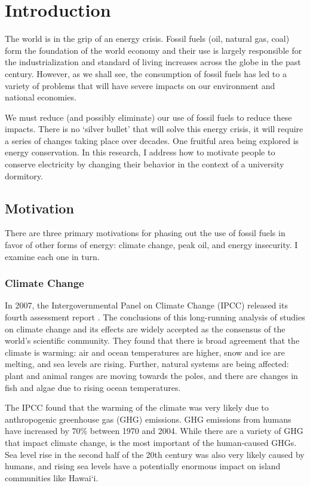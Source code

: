 \chapter{Introduction}

The world is in the grip of an energy crisis. Fossil fuels (oil, natural gas, coal) form the foundation of the world economy and their use is largely responsible for the industrialization and standard of living increases across the globe in the past century. However, as we shall see, the consumption of fossil fuels has led to a variety of problems that will have severe impacts on our environment and national economies.

We must reduce (and possibly eliminate) our use of fossil fuels to reduce these impacts. There is no `silver bullet' that will solve this energy crisis, it will require a series of changes taking place over decades. One fruitful area being explored is energy conservation. In this research, I address how to motivate people to conserve electricity by changing their behavior in the context of a university dormitory.

\section{Motivation}
\label{sec:motivation}

There are three primary motivations for phasing out the use of fossil fuels in favor of other forms of energy: climate change, peak oil, and energy insecurity. I examine each one in turn.

\subsection{Climate Change}
\label{sec:climate-change}

In 2007, the Intergovernmental Panel on Climate Change (IPCC) released its fourth assessment report \cite{IPCC-synthesis-report-2007}. The conclusions of this long-running analysis of studies on climate change and its effects are widely accepted as the consensus of the world's scientific community. They found that there is broad agreement that the climate is warming: air and ocean temperatures are higher, snow and ice are melting, and sea levels are rising. Further, natural systems are being affected: plant and animal ranges are moving towards the poles, and there are changes in fish and algae due to rising ocean temperatures.

The IPCC found that the warming of the climate was very likely due to anthropogenic greenhouse gas (GHG) emissions. GHG emissions from humans have increased by 70\% between 1970 and 2004. While there are a variety of GHG that impact climate change, \COtwo is the most important of the human-caused GHGs. Sea level rise in the second half of the 20th century was also very likely caused by humans, and rising sea levels have a potentially enormous impact on island communities like Hawai`i.


